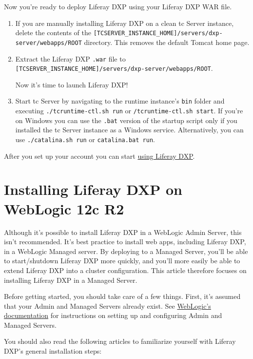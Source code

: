 Now you're ready to deploy Liferay DXP using your Liferay DXP WAR file.

\begin{enumerate}
\def\labelenumi{\arabic{enumi}.}
\item
  If you are manually installing Liferay DXP on a clean tc Server
  instance, delete the contents of the
  \texttt{{[}TCSERVER\_INSTANCE\_HOME{]}/servers/dxp-server/webapps/ROOT}
  directory. This removes the default Tomcat home page.
\item
  Extract the Liferay DXP \texttt{.war} file to
  \texttt{{[}TCSERVER\_INSTANCE\_HOME{]}/servers/dxp-server/webapps/ROOT}.

  Now it's time to launch Liferay DXP!
\item
  Start tc Server by navigating to the runtime instance's \texttt{bin}
  folder and executing \texttt{./tcruntime-ctl.sh\ run} or
  \texttt{/tcruntime-ctl.sh\ start}. If you're on Windows you can use
  the \texttt{.bat} version of the startup script only if you installed
  the tc Server instance as a Windows service. Alternatively, you can
  use \texttt{./catalina.sh\ run} or \texttt{catalina.bat\ run}.
\end{enumerate}

After you set up your account you can start
\href{/docs/7-0/user/-/knowledge_base/u/what-is-liferay}{using Liferay
DXP}.

\section{Installing Liferay DXP on WebLogic 12c
R2}\label{installing-liferay-dxp-on-weblogic-12c-r2}

Although it's possible to install Liferay DXP in a WebLogic Admin
Server, this isn't recommended. It's best practice to install web apps,
including Liferay DXP, in a WebLogic Managed server. By deploying to a
Managed Server, you'll be able to start/shutdown Liferay DXP more
quickly, and you'll more easily be able to extend Liferay DXP into a
cluster configuration. This article therefore focuses on installing
Liferay DXP in a Managed Server.

Before getting started, you should take care of a few things. First,
it's assumed that your Admin and Managed Servers already exist. See
\href{http://www.oracle.com/technetwork/middleware/weblogic/documentation/index.html}{WebLogic's
documentation} for instructions on setting up and configuring Admin and
Managed Servers.

You should also read the following articles to familiarize yourself with
Liferay DXP's general installation steps:

